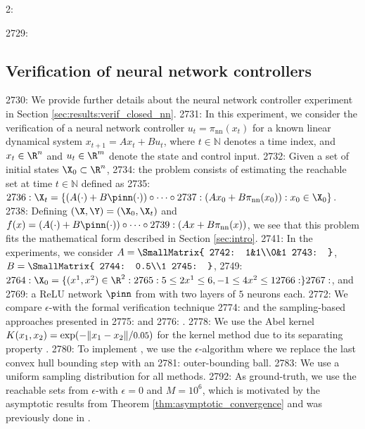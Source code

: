 2: \documentclass[12pt]{l4dc2022} %
\begin{document}
2729: \subsection{Verification of neural network controllers}\label{apdx:exps:nn}
2730: We provide further details about the neural network controller experiment in Section \ref{sec:results:verif_closed_nn}. 
2731: In this experiment, we consider the verification of a neural network controller $u_t=\pi_{\textrm{nn}}(x_t)$ for a known linear dynamical system $x_{t+1}=Ax_t+Bu_t$, where $t\in\mathbb{N}$ denotes a time index, and $x_t\in\R^n$ and $u_t\in\R^m$ denote the state and control input. %
2732: Given a set of initial states $\X_0\subset\R^n$, 
2734: the problem consists of estimating the reachable set at time $t\in\mathbb{N}$ defined as
2735: $
2736: \X_t=\{(A(\cdot)+B\pinn(\cdot))\circ\dots\circ 
2737: (Ax_0+B\pi_{\textrm{nn}}(x_0)): x_0\in\X_0\}$. 
2738: Defining $(\X,\Y)=(\X_0,\X_t)$ and $f(x)=(A(\cdot)+B\pinn(\cdot))\circ\dots\circ 
2739: (Ax+B\pi_{\textrm{nn}}(x))$, we see that this problem fits the mathematical form described in Section \ref{sec:intro}. %
2741: In the experiments, we consider $A=\SmallMatrix{
2742: 1&1\\0&1
2743: }$, $B=\SmallMatrix{
2744: 0.5\\1
2745: }$, %
2749: $
2764: \X_0=\{(x^1,x^2)\in\R^2:
2765: 5\leq 2x^1\leq 6, -1\leq 4x^2\leq 1
2766: \}
2767: $, and %
2769: a ReLU network $\pinn$ from \citep{Everett21_journal} with two layers of $5$ neurons each. 
2772: We compare $\epsilon$-\randup with the formal verification technique \reachlp \citep{Everett21_journal} %
2774: and the sampling-based approaches presented in %
2775: \citep{ThorpeL4DC2021} and %
2776: \citep{Gruenbacher2021}. 
2778: We use the Abel kernel $K(x_1,x_2)=\exp(-\|x_1-x_2\|/\scalebox{0.9}{$0.05$})$ for the kernel method \citep{ThorpeL4DC2021} due to its separating property \citep{DeVito2014}. 
2780: To implement \gotube \citep{Gruenbacher2021}, we use the $\epsilon$-\randup algorithm where we replace the last convex hull bounding step with an %
2781: outer-bounding ball. %
2783: We use a uniform sampling distribution for all methods. 
2792: As ground-truth, we use the reachable sets from $\epsilon$-\randup with $\epsilon=0$ and $M=10^6$, which is motivated by the asymptotic results from Theorem \ref{thm:asymptotic_convergence} and was previously done in \citep{Everett21_journal}. 
\end{document}
